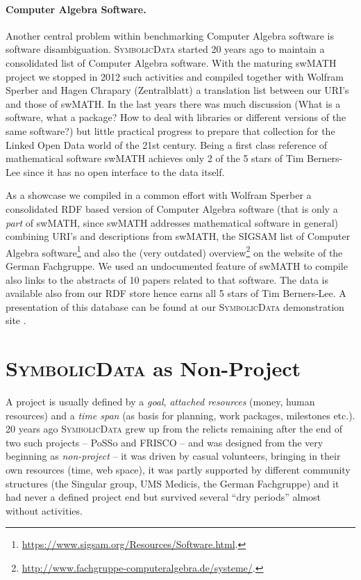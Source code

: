 \documentclass[a4paper,11pt]{article}
\def\SD{\textsc{SymbolicData}}
\begin{document}
\paragraph{Computer Algebra Software.}
Another central problem within benchmarking Computer Algebra software is
software disambiguation. {\SD} started 20 years ago to maintain a consolidated
list of Computer Algebra software. With the maturing swMATH project
\cite{swmath} we stopped in 2012 such activities and compiled together with
Wolfram Sperber and Hagen Chrapary (Zentralblatt) a translation list between
our URI's and those of swMATH. In the last years there was much discussion
(What is a software, what a package? How to deal with libraries or different
versions of the same software?)  but little practical progress to prepare that
collection for the Linked Open Data world of the 21st century. Being a first
class reference of mathematical software swMATH achieves only 2 of the 5 stars
of Tim Berners-Lee since it has no open interface to the data itself.

As a showcase we compiled in a common effort with Wolfram Sperber a
consolidated RDF based version of Computer Algebra software (that is only a
\emph{part} of swMATH, since swMATH addresses mathematical software in general)
combining URI's and descriptions from swMATH, the SIGSAM list of Computer
Algebra
software\footnote{\url{https://www.sigsam.org/Resources/Software.html}.} and
also the (very outdated)
overview\footnote{\url{http://www.fachgruppe-computeralgebra.de/systeme/}.} on
the website of the German Fachgruppe.  We used an undocumented feature of
swMATH to compile also links to the abstracts of 10 papers related to that
software.  The data is available also from our RDF store hence earns all 5
stars of Tim Berners-Lee.  A presentation of this database can be found at our
{\SD} demonstration site \cite{sdinfo}.

\section{{\SD} as Non-Project}

A project is usually defined by a \emph{goal}, \emph{attached resources}
(money, human resources) and a \emph{time span} (as basis for planning, work
packages, milestones etc.).  20 years ago {\SD} grew up from the relicts
remaining after the end of two such projects -- PoSSo and FRISCO -- and was
designed from the very beginning as \emph{non-project} -- it was driven by
casual volunteers, bringing in their own resources (time, web space), it was
partly supported by different community structures (the Singular group, UMS
Medicis, the German Fachgruppe) and it had never a defined project end but
survived several ``dry periods'' almost without activities.
\end{document}
